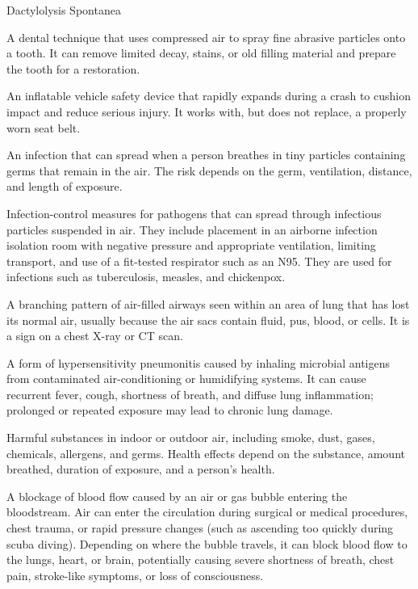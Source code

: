 \synonyms
Dactylolysis Spontanea

 A dental technique that uses compressed air to spray fine abrasive particles onto a tooth. It can remove limited decay, stains, or old filling material and prepare the tooth for a restoration.

 An inflatable vehicle safety device that rapidly expands during a crash to cushion impact and reduce serious injury. It works with, but does not replace, a properly worn seat belt.

 An infection that can spread when a person breathes in tiny particles containing germs that remain in the air. The risk depends on the germ, ventilation, distance, and length of exposure.

 Infection-control measures for pathogens that can spread through infectious particles suspended in air. They include placement in an airborne infection isolation room with negative pressure and appropriate ventilation, limiting transport, and use of a fit-tested respirator such as an N95. They are used for infections such as tuberculosis, measles, and chickenpox.

 A branching pattern of air-filled airways seen within an area of lung that has lost its normal air, usually because the air sacs contain fluid, pus, blood, or cells. It is a sign on a chest X-ray or CT scan.

 A form of hypersensitivity pneumonitis caused by inhaling microbial antigens from contaminated air-conditioning or humidifying systems. It can cause recurrent fever, cough, shortness of breath, and diffuse lung inflammation; prolonged or repeated exposure may lead to chronic lung damage.

 Harmful substances in indoor or outdoor air, including smoke, dust, gases, chemicals, allergens, and germs. Health effects depend on the substance, amount breathed, duration of exposure, and a person’s health.

 A blockage of blood flow caused by an air or gas bubble entering the bloodstream. Air can enter the circulation during surgical or medical procedures, chest trauma, or rapid pressure changes (such as ascending too quickly during scuba diving). Depending on where the bubble travels, it can block blood flow to the lungs, heart, or brain, potentially causing severe shortness of breath, chest pain, stroke-like symptoms, or loss of consciousness.

